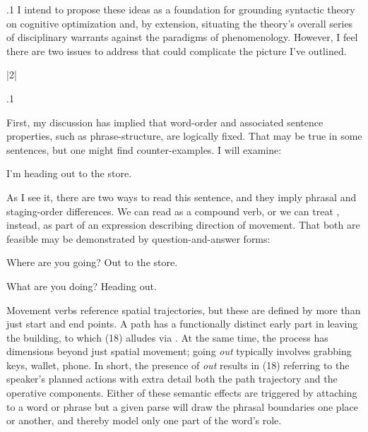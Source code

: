 \documentclass[11pt, twocolumn]{article}
\begin{document}
\p.1{%
\:\+I intend to propose these ideas as a foundation for
grounding syntactic theory on cognitive optimization
\mdash{} and, by extension, situating the theory's overall
series of disciplinary warrants against the paradigms
of phenomenology. \> However, I feel there are two
issues to address that could complicate the picture
I've outlined.\<\; \upAdj{14pt}
} %


\s|2|{}

\p.1{%
\:\+First, my discussion has implied that word-order and associated
sentence properties, such as phrase-structure, are logically
fixed. \> \pgl{}That
may be true in some sentences, but one might find
counter-examples. \> I will examine:\<

\begin{exsGroup}

\exsItem{}   I'm heading out to the store.

\end{exsGroup}

\nip{}%
\+As I see it, there are two ways 
to read this sentence, and they imply phrasal
and staging-order differences. \> We can read  as a compound
verb, or we can treat , instead, as part of an expression describing
direction of movement. \> That both are feasible may be demonstrated by
question-and-answer forms:\<

\begin{exsGroup}

\exsItem{}   Where are you going?  Out to the store.

\exsItem{}   What are you doing?  Heading out.

\end{exsGroup}

\nip{}%
\+Movement verbs reference spatial trajectories, but these are
defined by more than just start and end points. \> A path
 has a functionally distinct early part in leaving
the building, to which \exsRef(18) alludes via . \> At the same time,
the process has dimensions beyond just spatial movement; going
\textit{out} typically involves grabbing keys, wallet, 
phone. \> In short, the presence of \textit{out} results in \exsRef(18) referring to
the speaker's planned actions with extra detail both \visavis{} the
path trajectory and the operative components. \> Either of these
semantic effects are triggered by attaching  to a word
or phrase \mdash{} but a given parse will draw the phrasal boundaries
one place or another, and thereby model only 
one part of the word's role.\<\;
} %
\end{document}
